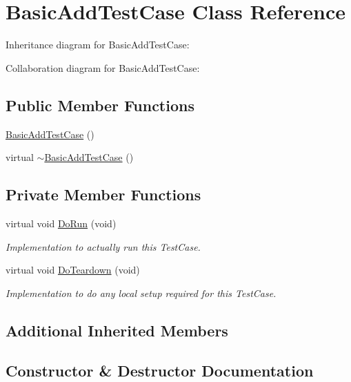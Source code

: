 \hypertarget{classBasicAddTestCase}{}\section{Basic\+Add\+Test\+Case Class Reference}
\label{classBasicAddTestCase}


Inheritance diagram for Basic\+Add\+Test\+Case\+:


Collaboration diagram for Basic\+Add\+Test\+Case\+:
\subsection*{Public Member Functions}
\begin{DoxyCompactItemize}
\item 
\hyperlink{classBasicAddTestCase_a496968dafd0dd1fecee7a4e3419322c6}{Basic\+Add\+Test\+Case} ()
\item 
virtual \hyperlink{classBasicAddTestCase_a8f37105ef130e800cf04dcf71a1379f2}{$\sim$\+Basic\+Add\+Test\+Case} ()
\end{DoxyCompactItemize}
\subsection*{Private Member Functions}
\begin{DoxyCompactItemize}
\item 
virtual void \hyperlink{classBasicAddTestCase_a90f4bca47cb1a2c8e557d23aa600709c}{Do\+Run} (void)
\begin{DoxyCompactList}\small\item\em Implementation to actually run this Test\+Case. \end{DoxyCompactList}\item 
virtual void \hyperlink{classBasicAddTestCase_ad5695806dc2c7d978644db7572f4f69f}{Do\+Teardown} (void)
\begin{DoxyCompactList}\small\item\em Implementation to do any local setup required for this Test\+Case. \end{DoxyCompactList}\end{DoxyCompactItemize}
\subsection*{Additional Inherited Members}


\subsection{Constructor \& Destructor Documentation}
